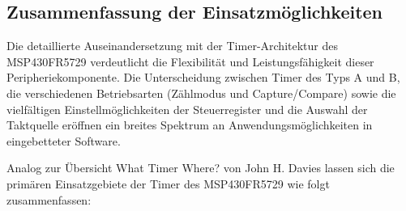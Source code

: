 \newpage
\subsection{Zusammenfassung der Einsatzm\"oglichkeiten}
\label{sec:TimerEinsatzmoeglichkeiten}

Die detaillierte Auseinandersetzung mit der Timer-Architektur des MSP430FR5729 verdeutlicht die Flexibilit\"at und Leistungsf\"ahigkeit dieser Peripheriekomponente. Die Unterscheidung zwischen Timer des Typs A und B, die verschiedenen Betriebsarten (Z\"ahlmodus und Capture/Compare) sowie die vielf\"altigen Einstellm\"oglichkeiten der Steuerregister und die Auswahl der Taktquelle er\"offnen ein breites Spektrum an Anwendungsm\"oglichkeiten in eingebetteter Software.

Analog zur \"Ubersicht \glqq What Timer Where?\grqq{} von John H. Davies lassen sich die prim\"aren Einsatzgebiete der Timer des MSP430FR5729 wie folgt zusammenfassen: 

